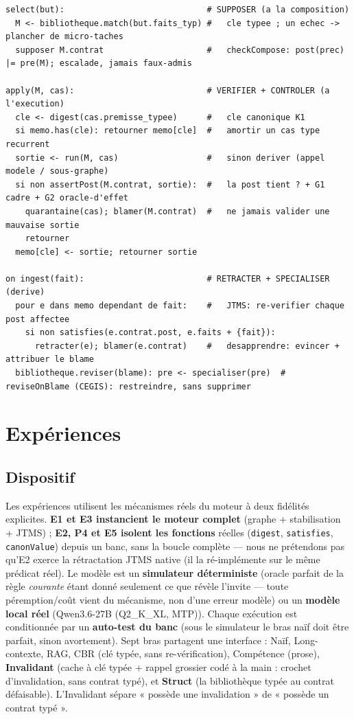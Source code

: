 \documentclass[11pt]{article}
\begin{document}
\begin{lstlisting}
select(but):                             # SUPPOSER (a la composition)
  M <- bibliotheque.match(but.faits_typ) #   cle typee ; un echec -> plancher de micro-taches
  supposer M.contrat                     #   checkCompose: post(prec) |= pre(M); escalade, jamais faux-admis

apply(M, cas):                           # VERIFIER + CONTROLER (a l'execution)
  cle <- digest(cas.premisse_typee)      #   cle canonique K1
  si memo.has(cle): retourner memo[cle]  #   amortir un cas type recurrent
  sortie <- run(M, cas)                  #   sinon deriver (appel modele / sous-graphe)
  si non assertPost(M.contrat, sortie):  #   la post tient ? + G1 cadre + G2 oracle-d'effet
    quarantaine(cas); blamer(M.contrat)  #   ne jamais valider une mauvaise sortie
    retourner
  memo[cle] <- sortie; retourner sortie

on ingest(fait):                         # RETRACTER + SPECIALISER (derive)
  pour e dans memo dependant de fait:    #   JTMS: re-verifier chaque post affectee
    si non satisfies(e.contrat.post, e.faits + {fait}):
      retracter(e); blamer(e.contrat)    #   desapprendre: evincer + attribuer le blame
  bibliotheque.reviser(blame): pre <- specialiser(pre)  # reviseOnBlame (CEGIS): restreindre, sans supprimer
\end{lstlisting}

\section{Expériences}
\subsection{Dispositif}
Les expériences utilisent les mécanismes réels du moteur à deux fidélités explicites. \textbf{E1 et E3 instancient
le moteur complet} (graphe + stabilisation + JTMS) ; \textbf{E2, P4 et E5 isolent les fonctions} réelles
(\texttt{digest}, \texttt{satisfies}, \texttt{canonValue}) depuis un banc, sans la boucle complète --- nous ne
prétendons pas qu'E2 exerce la rétractation JTMS native (il la ré-implémente sur le même prédicat réel). Le modèle
est un \textbf{simulateur déterministe} (oracle parfait de la règle \emph{courante} étant donné seulement ce que
révèle l'invite --- toute péremption/coût vient du mécanisme, non d'une erreur modèle) ou un \textbf{modèle local
réel} (Qwen3.6-27B (Q2\_K\_XL, MTP)). Chaque exécution est conditionnée par un \textbf{auto-test du banc} (sous le
simulateur le bras naïf doit être parfait, sinon avortement). Sept bras partagent une interface : Naïf,
Long-contexte, RAG, CBR (clé typée, sans re-vérification), Compétence (prose), \textbf{Invalidant} (cache à clé
typée + rappel grossier codé à la main : crochet d'invalidation, sans contrat typé), et \textbf{Struct} (la
bibliothèque typée au contrat défaisable). L'Invalidant sépare « possède une invalidation » de « possède un contrat
typé ».
\end{document}
